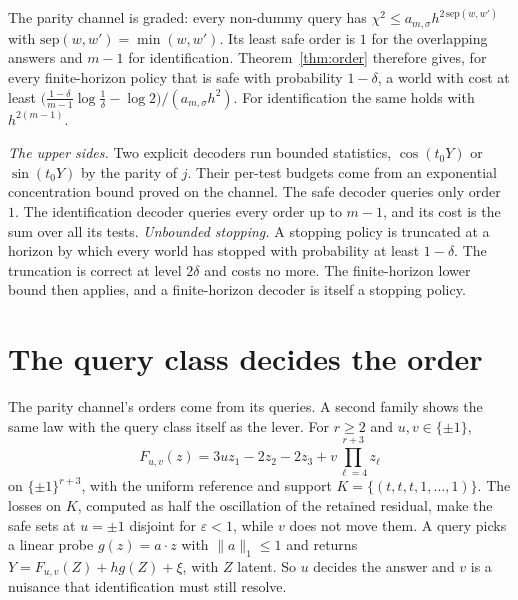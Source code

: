 
\begin{theorem}
\label{thm:parlaw}
The parity channel is graded: every non-dummy query has
$\chi^{2}\le a_{m,\sigma}h^{2\,\mathrm{sep}(w,w')}$ with $\mathrm{sep}(w,w')=\min(w,w')$. Its least
safe order is $1$ for the overlapping answers and $m-1$ for identification. Theorem~\ref{thm:order}
therefore gives, for every finite-horizon policy that is safe with probability $1-\delta$, a
world with cost at least
$\bigl(\frac{1-\delta}{m-1}\log\frac1\delta-\log2\bigr)/(a_{m,\sigma}h^{2})$. For identification
the same holds with $h^{2(m-1)}$.
\end{theorem}


\emph{The upper sides.} Two explicit decoders run bounded statistics, $\cos(t_{0}Y)$ or
$\sin(t_{0}Y)$ by the parity of $j$. Their per-test budgets come from an exponential
concentration bound proved on the channel. The safe decoder queries only order $1$. The
identification decoder queries every order up to $m-1$, and its cost is the sum over all its
tests. \emph{Unbounded stopping.} A stopping policy is truncated at a horizon by which every
world has stopped with probability at least $1-\delta$. The truncation is correct at level
$2\delta$ and costs no more. The finite-horizon lower bound then applies, and a finite-horizon
decoder is itself a stopping policy.


\section{The query class decides the order}
\label{sec:family}

The parity channel's orders come from its queries. A second family shows the same law with the
query class itself as the lever. For $r\ge2$ and $u,v\in\{\pm1\}$,
\[
F_{u,v}(z)=3uz_{1}-2z_{2}-2z_{3}+v\prod_{\ell=4}^{r+3}z_{\ell}
\]
on $\{\pm1\}^{r+3}$, with the uniform reference and support
$K=\{(t,t,t,1,\dots,1)\}$. The losses on $K$, computed as half the oscillation of the retained
residual, make the safe sets at $u=\pm1$ disjoint for $\varepsilon<1$, while $v$ does not move
them. \CERT{} A query picks a linear probe $g(z)=a\cdot z$ with $\|a\|_{1}\le1$ and returns
$Y=F_{u,v}(Z)+hg(Z)+\xi$, with $Z$ latent. So $u$ decides the answer and $v$ is a nuisance that
identification must still resolve.

